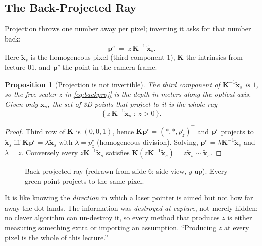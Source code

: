 \documentclass[11pt,a4paper]{article}
\newcommand{\xt}{\tilde{\mathbf{x}}}
\newcommand{\Kinv}{\bm K^{-1}}
\theoremstyle{definition}
\theoremstyle{plain}
\newtheorem{proposition}[definition]{Proposition}
\theoremstyle{remark}
\begin{document}
\subsection{The Back-Projected Ray }
 
Projection throws one number away per pixel; inverting it asks for that number back:
\begin{equation}\label{eq:backproj}
\bm p^{c} \;=\; z\,\Kinv\,\xt_s .
\end{equation}
Here $\xt_s$ is the homogeneous pixel (third component $1$), $\bm K$ the intrinsics from lecture 01, and $\bm p^c$ the point in the camera frame.
 
\begin{proposition}[Projection is not invertible]\label{prop:ray}
The third component of $\Kinv\xt_s$ is $1$, so the free scalar $z$ in \eqref{eq:backproj} is the depth in meters along the optical axis. Given only $\bm x_s$, the set of 3D points that project to it is the whole ray
\[
\{\, z\,\Kinv\xt_s \;:\; z>0 \,\}.
\]
\end{proposition}
\begin{proof}
Third row of $\bm K$ is $(0,0,1)$, hence $\bm K\bm p^c=(\ast,\ast,p^c_z)^\top$ and $\bm p^c$ projects to $\xt_s$ iff $\bm K\bm p^c=\lambda\xt_s$ with $\lambda=p^c_z$ (homogeneous division). Solving, $\bm p^c=\lambda\Kinv\xt_s$ and $\lambda=z$. Conversely every $z\Kinv\xt_s$ satisfies $\bm K(z\Kinv\xt_s)=z\xt_s\sim\xt_s$. \qedhere
\end{proof}
 
\begin{figure}[htbp]
\centering
{}
\caption{Back-projected ray (redrawn from slide 6; side view, $y$ up). Every green point projects to the same pixel.}\label{fig:ray}
\end{figure}
 
\begin{intuition}
It is like knowing the \emph{direction} in which a laser pointer is aimed but not how far away the dot lands. The information was \emph{destroyed at capture}, not merely hidden: no clever algorithm can un-destroy it, so every method that produces $z$ is either measuring something extra or importing an assumption. ``Producing $z$ at every pixel is the whole of this lecture.''
\end{intuition}
 
\end{document}
